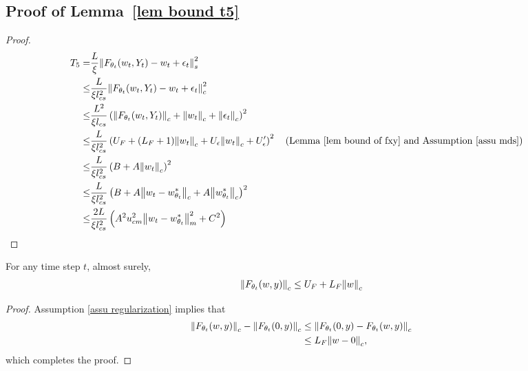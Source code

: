 \documentclass[twoside,11pt]{article}
\numberwithin{assucounter}{section}
\begin{document}
\subsection{Proof of Lemma~\ref{lem bound t5}}
\label{sec proof lem bound t5}
\lemboundtfive*
\begin{proof}
  \begin{align}
      T_5 =&\frac{L }{\xi}\norm{F_{\theta_t}(w_t, Y_t) - w_t + \epsilon_t}_s^2 \\
      \leq& \frac{L }{\xi l_{cs}^2}\norm{F_{\theta_t}(w_t, Y_t) - w_t + \epsilon_t}_c^2  \\
      \leq& \frac{L^2 }{\xi l_{cs}}\left(\norm{F_{\theta_t}(w_t, Y_t)}_c + \norm{w_t}_c + \norm{\epsilon_t}_c \right)^2  \\
      \leq& \frac{L }{\xi l_{cs}^2}\left(U_F + (L_F + 1) \norm{w_t}_c + U_\epsilon \norm{w_t}_c + U_\epsilon'\right)^2 \qq{(Lemma~\ref{lem bound of fxy} and Assumption~\ref{assu mds})} \\
      \leq& \frac{L }{\xi l_{cs}^2}\left(B + A \norm{w_t}_c\right)^2  \\
      \leq& \frac{L }{\xi l_{cs}^2}\left(B + A \norm{w_t - w^*_{\theta_t}}_c + A\norm{w^*_{\theta_t}}_c\right)^2  \\
      \leq& \frac{2L}{\xi l_{cs}^2}\left(A^2 u_{cm}^2 \norm{w_t - w^*_{\theta_t}}_m^2 + C^2\right)
  \end{align}
\end{proof}



\begin{lemma}
  \label{lem bound of fxy}
  For any time step $t$, almost surely,
  \begin{align}
      \norm{F_{\theta_t}(w, y)}_c \leq U_F + L_F \norm{w}_c
  \end{align}
\end{lemma}
\begin{proof}
  Assumption \ref{assu regularization} implies that
  \begin{align}
      \norm{F_{\theta_t}(w, y)}_c - \norm{F_{\theta_t}(0, y)}_c  &\leq \norm{F_{\theta_t}(0, y) - F_{\theta_t}(w, y)}_c \\
      &\leq L_F \norm{w - 0}_c,
  \end{align}
  which completes the proof.
\end{proof}
\end{document}
